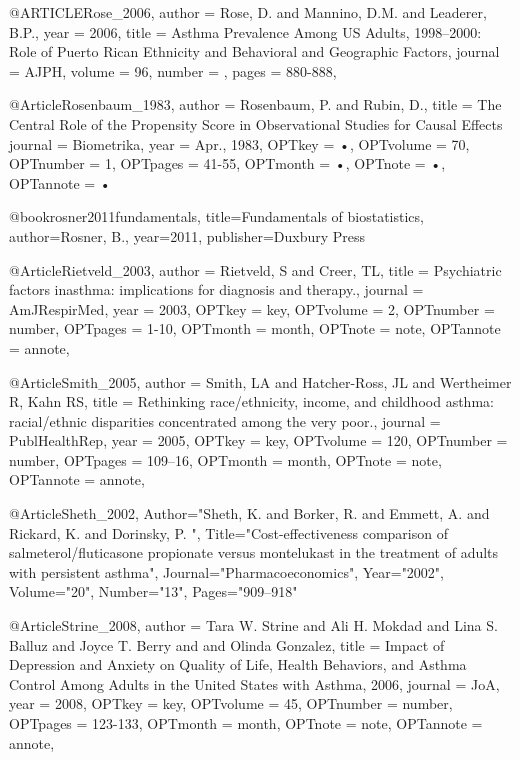 {{{@ARTICLE{Rose_2006,
  author = {Rose, D. and Mannino, D.M. and Leaderer, B.P.},
  year = {2006},
  title = {Asthma Prevalence Among US Adults, 1998–2000: Role of Puerto Rican Ethnicity and Behavioral and Geographic Factors},
  journal = AJPH,
  volume =  {96},
  number = {},
  pages = {880-888},
}

@Article{Rosenbaum_1983,
author = {Rosenbaum, P. and Rubin, D.},
title = {The Central Role of the Propensity Score in Observational Studies for Causal Effects}
journal = {Biometrika},
year = {Apr., 1983},
OPTkey = {•},
OPTvolume = {70},
OPTnumber = {1},
OPTpages = {41-55},
OPTmonth = {•},
OPTnote = {•},
OPTannote = {•}
}

@book{rosner2011fundamentals,
  title={Fundamentals of biostatistics},
  author={Rosner, B.},
  year={2011},
  publisher={Duxbury Press}
}

@Article{Rietveld_2003,
author = {Rietveld, S and Creer, TL},
title = {Psychiatric factors inasthma: implications for diagnosis and therapy.},
journal = {AmJRespirMed},
year = {2003},
OPTkey = {key},
OPTvolume = {2},
OPTnumber = {number},
OPTpages = {1-10},
OPTmonth = {month},
OPTnote = {note},
OPTannote = {annote},
}



@Article{Smith_2005,
author = {Smith, LA and Hatcher-Ross, JL and Wertheimer R, Kahn RS},
title = {Rethinking race/ethnicity, income, and childhood asthma: racial/ethnic disparities concentrated
among the very poor.},
journal = {PublHealthRep},
year = {2005},
OPTkey = {key},
OPTvolume = {120},
OPTnumber = {number},
OPTpages = {109–16},
OPTmonth = {month},
OPTnote = {note},
OPTannote = {annote},
}

@Article{Sheth_2002,
   Author="Sheth, K.  and Borker, R.  and Emmett, A.  and Rickard, K.  and Dorinsky, P. ",
   Title="{{C}ost-effectiveness comparison of salmeterol/fluticasone propionate versus montelukast in the treatment of adults with persistent asthma}",
   Journal="Pharmacoeconomics",
   Year="2002",
   Volume="20",
   Number="13",
   Pages="909--918"
}


@Article{Strine_2008,
author = {Tara W. Strine and Ali H. Mokdad and Lina S. Balluz and Joyce T. Berry and and Olinda Gonzalez},
title = {Impact of Depression and Anxiety on Quality of Life, Health Behaviors, and Asthma Control Among Adults in the United States with Asthma, 2006},
journal = {JoA},
year = {2008},
OPTkey = {key},
OPTvolume = {45},
OPTnumber = {number},
OPTpages = {123-133},
OPTmonth = {month},
OPTnote = {note},
OPTannote = {annote},
}

}}}
